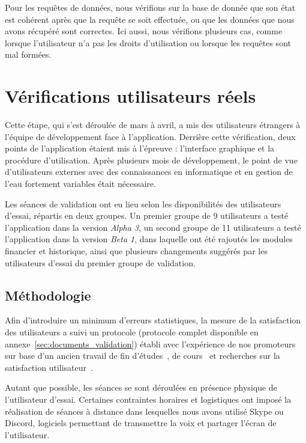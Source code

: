 \documentclass{EPL-master-thesis-covers-FR}
\begin{document}
				Pour les requêtes de données, nous vérifions sur la base de donnée que son état est cohérent après que la requête se soit effectuée, ou que les données que nous avons récupéré sont correctes. Ici aussi, nous vérifions plusieurs cas, comme lorsque l'utilisateur n'a pas les droits d'utilisation ou lorsque les requêtes sont mal formées.


		\section{Vérifications utilisateurs réels}
			Cette étape, qui s'est déroulée de mars à avril, a mis des utilisateurs étrangers à l'équipe de développement face à l'application. Derrière cette vérification, deux points de l'application étaient mis à l'épreuve : l'interface graphique et la procédure d'utilisation. Après plusieurs mois de développement, le point de vue d'utilisateurs externes avec des connaissances en informatique et en gestion de l'eau fortement variables était nécessaire.

			Les séances de validation ont eu lieu selon les disponibilités des utilisateurs d'essai, répartis en deux groupes. Un premier groupe de 9 utilisateurs a testé l'application dans la version \emph{Alpha 3}, un second groupe de 11 utilisateurs a testé l'application dans la version \emph{Beta 1}, dans laquelle  ont été rajoutés les modules financier et historique, ainsi que plusieurs changements suggérés par les utilisateurs d'essai du premier groupe de validation.

			\subsection*{Méthodologie}

				Afin d'introduire un minimum d'erreurs statistiques, la mesure de la satisfaction des utilisateurs a suivi un protocole (protocole complet disponible en annexe~\ref{sec:documents_validation}) établi avec l'expérience de nos promoteurs sur base d'un ancien travail de fin d'études~\cite{ref:reflecton}, de cours~\cite{ref:vanderdonckt_hci, ref:vanderdonckt_cscw} et recherches sur la satisfaction utilisateur~\cite{ref:usability_evaluation_tools, ref:ssi}.

				Autant que possible, les séances se sont déroulées en présence physique de l'utilisateur d'essai. Certaines contraintes horaires et logistiques ont imposé la réalisation de séances à distance dans lesquelles nous avons utilisé Skype ou Discord, logiciels permettant de transmettre la voix et partager l'écran de l'utilisateur.
\end{document}
